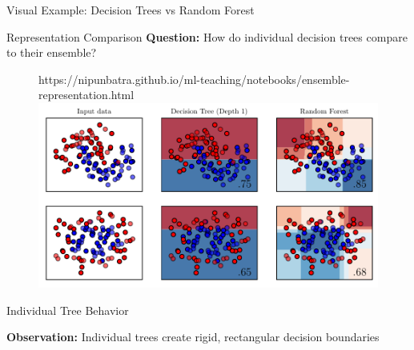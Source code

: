 \documentclass[9pt]{beamer}
\newcommand{\fitpic}[1]{\begin{adjustbox}{max width=\linewidth, max totalheight=0.78\textheight}#1\end{adjustbox}}
\begin{document}
\begin{frame}{Visual Example: Decision Trees vs Random Forest}
\begin{alertbox}{Representation Comparison}
\textbf{Question:} How do individual decision trees compare to their ensemble?
\end{alertbox}

\begin{figure}[htp]
  \centering
  \begin{notebookbox}{https://nipunbatra.github.io/ml-teaching/notebooks/ensemble-representation.html}
    \fitpic{\includegraphics[scale=0.6]{../assets/ensemble/figures/1-representation.pdf}}
  \end{notebookbox}
\end{figure}
\end{frame}

\begin{frame}{Individual Tree Behavior}
\begin{keypointsbox}
\textbf{Observation:} Individual trees create rigid, rectangular decision boundaries
\end{keypointsbox}
\end{frame}
\end{document}
